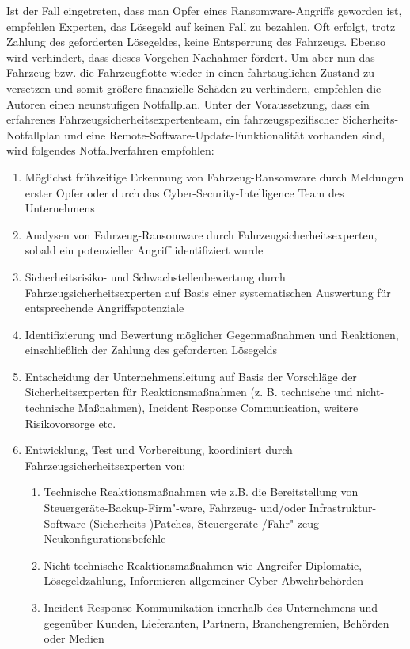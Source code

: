 Ist der Fall eingetreten, dass man Opfer eines Ransomware-Angriffs geworden ist, empfehlen Experten, 
das Lösegeld auf keinen Fall zu bezahlen. Oft erfolgt, trotz Zahlung des geforderten Lösegeldes, keine 
Entsperrung des Fahrzeugs. Ebenso wird verhindert, dass dieses Vorgehen Nachahmer fördert. 
\newline
Um aber nun das Fahrzeug bzw. die Fahrzeugflotte wieder in einen fahrtauglichen Zustand zu versetzen und 
somit größere finanzielle Schäden zu verhindern, empfehlen die Autoren einen neunstufigen Notfallplan. 
Unter der Voraussetzung, dass ein erfahrenes Fahrzeugsicherheitsexpertenteam, ein fahrzeugspezifischer 
Sicherheits-Notfallplan und eine Remote-Software-Update-Funktionalität vorhanden sind, wird folgendes 
Notfallverfahren empfohlen:

\begin{enumerate}
    \item Möglichst frühzeitige Erkennung von Fahrzeug-Ransomware durch Meldungen erster Opfer 
    oder durch das Cyber-Security-Intelligence Team des Unternehmens
    \item Analysen von Fahrzeug-Ransomware durch Fahrzeugsicherheitsexperten, sobald ein potenzieller Angriff 
    identifiziert wurde
    \item Sicherheitsrisiko- und Schwachstellenbewertung durch Fahrzeugsicherheitsexperten auf Basis 
    einer systematischen Auswertung für entsprechende Angriffspotenziale 
    \item Identifizierung und Bewertung möglicher Gegenmaßnahmen und Reaktionen, einschließlich der 
    Zahlung des geforderten Lösegelds
    \item Entscheidung der Unternehmensleitung auf Basis der Vorschläge der Sicherheitsexperten für 
    Reaktionsmaßnahmen (z. B. technische und nicht-technische Maßnahmen), Incident Response Communication, 
    weitere Risikovorsorge etc.
    \item Entwicklung, Test und Vorbereitung, koordiniert durch Fahrzeugsicherheitsexperten von:

    \begin{enumerate}
        \item Technische Reaktionsmaßnahmen wie z.B. die Bereitstellung von Steuergeräte-Backup-Firm"-ware, 
        Fahrzeug- und/oder Infrastruktur-Software-(Sicherheits-)Patches, Steuergeräte-/Fahr"-zeug-
        Neukonfigurationsbefehle
        \item Nicht-technische Reaktionsmaßnahmen wie Angreifer-Diplomatie, Lösegeldzahlung, Informieren 
        allgemeiner Cyber-Abwehrbehörden
        \item Incident Response-Kommunikation innerhalb des Unternehmens und gegenüber Kunden, Lieferanten, 
        Partnern, Branchengremien, Behörden oder Medien
    \end{enumerate}


\end{enumerate}
